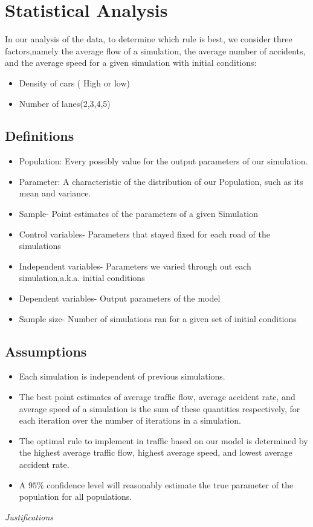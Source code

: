 \documentclass{amsart}
\begin{document}
\section{\bfseries{Statistical Analysis}}
	In our analysis of the data, to determine which rule is best, we consider three factors,namely the average flow of a simulation, the average number of accidents, and the average speed for a given simulation with initial conditions:
	\begin{itemize}
		\item Density of cars ( High or low)
		\item Number of lanes(2,3,4,5)
	\end{itemize}
	
	\subsection{Definitions}


	\begin{itemize}
		\item Population: Every possibly value for the output parameters of our simulation.
		\item Parameter: A characteristic of the distribution of our Population, such as its mean and variance.
		\item Sample- Point estimates of the parameters of a given Simulation
		\item Control variables- Parameters that stayed fixed for each road of the simulations
		\item Independent variables- Parameters we varied through out each simulation,a.k.a. initial conditions
		\item Dependent variables- Output parameters of the model
		\item Sample size- Number of simulations ran for a given set of initial conditions
	
	\end{itemize}

	\subsection{Assumptions}
	\begin{itemize}
		\item Each simulation is independent of previous simulations.
		\item The best point estimates of average traffic flow, average accident rate, and average speed of a simulation is the sum of these quantities respectively, for each iteration over the number of iterations in a simulation.
		\item The optimal rule to implement in traffic based on our model is determined by the highest average traffic flow, highest average speed, and lowest average accident rate.
		\item A $95\%$ confidence level will reasonably estimate the true parameter of the population for all populations.
	\end{itemize}
	\textit{Justifications}
	
\end{document}
